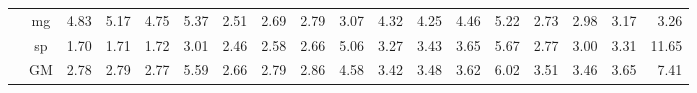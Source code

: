 \begin{table}[]
\begin{center}
{\begin{tabular}{|c|c|rrrr|rrrr|rrrr|rrrr|}
 &  mg  &  4.83  &  5.17  & \cellcolor{blue!25} 4.75  &   5.37  &  2.51  &  2.69  &  2.79  &  3.07  &  4.32  & \cellcolor{blue!25} 4.25  &  4.46  &   5.22  &  2.73  &  2.98  &  3.17  &   3.26 \\
 &  sp  &  1.70  &  1.71  &  1.72  &   3.01  &  2.46  &  2.58  &  2.66  &  5.06  &  3.27  &  3.43  &  3.65  &   5.67  &  2.77  &  3.00  &  3.31  &  11.65 \\
 &  GM  &  2.78  &  2.79  & \cellcolor{blue!25} 2.77  &   5.59  &  2.66  &  2.79  &  2.86  &  4.58  &  3.42  &  3.48  &  3.62  &   6.02  &  3.51  & \cellcolor{blue!25} 3.46  &  3.65  &   7.41 \\
\hline
\end{tabular} }

\end{center}
\end{table}
